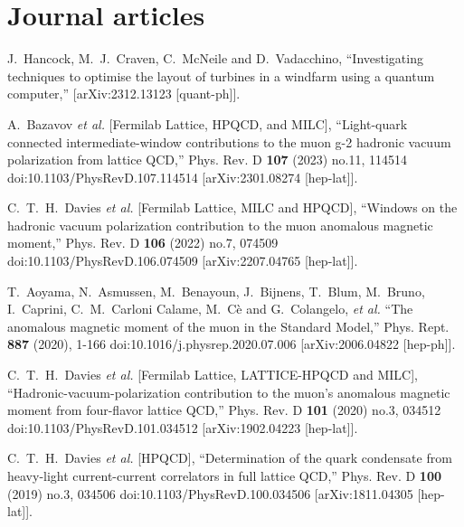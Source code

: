 \section{Journal articles}

\begin{thebibliography}{130}


J.~Hancock, M.~J.~Craven, C.~McNeile and D.~Vadacchino,
``Investigating techniques to optimise the layout of turbines in a windfarm using a quantum computer,''
[arXiv:2312.13123 [quant-ph]].
  
A.~Bazavov \textit{et al.} [Fermilab Lattice, HPQCD, and MILC],
``Light-quark connected intermediate-window contributions to the muon g-2 hadronic vacuum polarization from lattice QCD,''
Phys. Rev. D \textbf{107} (2023) no.11, 114514
doi:10.1103/PhysRevD.107.114514
[arXiv:2301.08274 [hep-lat]].
  
C.~T.~H.~Davies \textit{et al.} [Fermilab Lattice, MILC and HPQCD],
``Windows on the hadronic vacuum polarization contribution to the
muon anomalous magnetic moment,''
Phys. Rev. D \textbf{106} (2022) no.7, 074509
doi:10.1103/PhysRevD.106.074509
[arXiv:2207.04765 [hep-lat]].

T.~Aoyama, N.~Asmussen, M.~Benayoun, J.~Bijnens, T.~Blum, M.~Bruno,
I.~Caprini, C.~M.~Carloni Calame, M.~C\`e and G.~Colangelo, \textit{et
  al.}
``The anomalous magnetic moment of the muon in the Standard Model,''
Phys. Rept. \textbf{887} (2020), 1-166
doi:10.1016/j.physrep.2020.07.006
[arXiv:2006.04822 [hep-ph]].

C.~T.~H.~Davies \textit{et al.} [Fermilab Lattice, LATTICE-HPQCD and
  MILC],
``Hadronic-vacuum-polarization contribution to the
muon\textquoteright{}s anomalous magnetic moment from four-flavor
lattice QCD,''
Phys. Rev. D \textbf{101} (2020) no.3, 034512
doi:10.1103/PhysRevD.101.034512
[arXiv:1902.04223 [hep-lat]].

C.~T.~H.~Davies \textit{et al.} [HPQCD],
``Determination of the quark condensate from heavy-light
current-current correlators in full lattice QCD,''
Phys. Rev. D \textbf{100} (2019) no.3, 034506
doi:10.1103/PhysRevD.100.034506
[arXiv:1811.04305 [hep-lat]].


\end{thebibliography}

